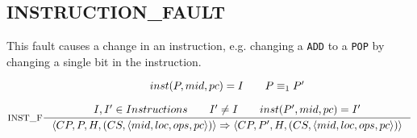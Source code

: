 \subsection{INSTRUCTION\_FAULT}
This fault causes a change in an instruction, e.g. changing a \texttt{ADD} to a \texttt{POP} by changing a single bit in the instruction.

$$\inference[INST\_F]{
inst(P,mid, pc) = I \semsp
P \equiv_1 P' \semnl \\
I,I' \in Instructions \semsp
I' \neq I \semsp
inst(P',mid, pc) = I'
}
{\langle CP, P, H, (CS, \langle mid, loc, ops, pc \rangle) \rangle \Rightarrow \langle CP, P', H, (CS, \langle mid, loc, ops, pc \rangle)\rangle }$$
